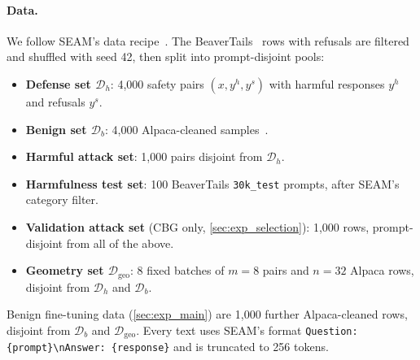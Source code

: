 \documentclass[11pt]{article}
\begin{document}
\paragraph{Data.}
We follow SEAM's data recipe~\citep{wang2026seam}. The BeaverTails~\citep{ji2023beavertails} rows with refusals are filtered and shuffled with seed 42, then split into prompt-disjoint pools:
\begin{itemize}
  \item \textbf{Defense set $\mathcal D_h$}: 4{,}000 safety pairs $(x, y^h, y^s)$ with harmful responses $y^h$ and refusals $y^s$.
  \item \textbf{Benign set $\mathcal D_b$}: 4{,}000 Alpaca-cleaned samples~\citep{taori2023alpaca}.
  \item \textbf{Harmful attack set}: 1{,}000 pairs disjoint from $\mathcal D_h$.
  \item \textbf{Harmfulness test set}: 100 BeaverTails \texttt{30k\_test} prompts, after SEAM's category filter.
  \item \textbf{Validation attack set} (CBG only, \cref{sec:exp_selection}): 1{,}000 rows, prompt-disjoint from all of the above.
  \item \textbf{Geometry set $\mathcal D_{\mathrm{geo}}$}: 8 fixed batches of $m=8$ pairs and $n=32$ Alpaca rows, disjoint from $\mathcal D_h$ and $\mathcal D_b$.
\end{itemize}
Benign fine-tuning data (\cref{sec:exp_main}) are 1{,}000 further Alpaca-cleaned rows, disjoint from $\mathcal D_b$ and $\mathcal D_{\mathrm{geo}}$. Every text uses SEAM's format \texttt{Question: \{prompt\}\textbackslash nAnswer: \{response\}} and is truncated to 256 tokens.
\end{document}
